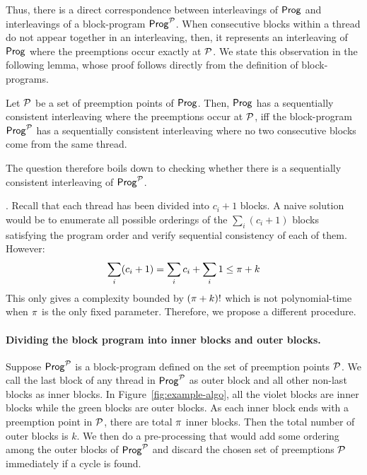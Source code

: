 Thus,  there is a direct correspondence between interleavings of $\mathsf{Prog}$ and interleavings of a block-program $\mathsf{Prog}^{\mathcal{P}}$. When consecutive blocks within a thread do not appear together in an interleaving, then, it represents an interleaving of $\mathsf{Prog}$ where the preemptions occur exactly at $\mathcal{P}$.  We state this observation in the following lemma, whose proof follows directly from the definition of block-programs.


\begin{lemma}
Let $\mathcal{P}$ be a set of preemption points of $\mathsf{Prog}$. Then, $\mathsf{Prog}$ has a sequentially consistent interleaving where the preemptions occur at $\mathcal{P}$, iff the block-program $\mathsf{Prog}^{\mathcal{P}}$ has a sequentially consistent interleaving where no two consecutive blocks come from the same thread. 
\end{lemma}

The question therefore boils down to checking whether there is a sequentially consistent interleaving of $\mathsf{Prog}^{\mathcal{P}}$.

.  
Recall that each thread has been divided into $c_i + 1$ blocks. A naive solution would be to enumerate all possible orderings of the $\sum_i (c_i + 1)$ blocks satisfying the program order and verify sequential consistency of each of them. However:
\begin{equation} 
  \sum_i (c_i + 1) = \sum_i c_i + \sum_i 1 \le \pi + k  \label{eq:naive} 
\end{equation} 
This only gives a complexity bounded by $(\pi + k)!$ which is not polynomial-time  when $\pi$ is the only fixed parameter.
Therefore, we propose a different procedure. 

\paragraph*{Dividing the block program into inner blocks and outer blocks.} Suppose $\mathsf{Prog}^{\mathcal{P}}$ is a block-program defined on the set of preemption points $\mathcal{P}$. We call the last block of any thread in $\mathsf{Prog}^{\mathcal{P}}$ as outer block and all other non-last blocks as inner blocks. In Figure~\ref{fig:example-algo}, all the violet blocks are inner blocks while the green blocks are outer blocks. As each inner block ends with a preemption point in $\mathcal{P}$, there are total $\pi$ inner blocks. Then the total number of outer blocks is $k$. We then  do a pre-processing that would add some ordering among the outer blocks of $\mathsf{Prog}^{\mathcal{P}}$ and discard the chosen set of preemptions $\mathcal{P}$ immediately if a cycle is found. 



